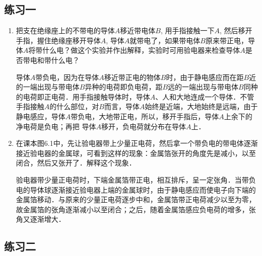 \subsection{练习一}
\begin{enumerate}
    \item 把支在绝缘座上的不带电的导体$A$移近带电体$B$, 用手指接触一下$A$, 然后移开手指，握住绝缘座移开导体$A$, 导体$A$就带电了，如果带电体$B$原来带正电，导体$A$将带什么电？做这个实验并作出解释，实验时可用验电器来检查导体$A$是否带电和带什么电？
    
    \begin{solution}
        导体$A$带负电，因为在导体$A$移近带正电的物体$B$时，由于静电感应而在距$B$近的一端出现与带电体$B$异种的电荷即负电荷，距$B$远的一端出现与带电体$B$同种的电荷即正电荷．用手指接触导体时，导体$A$、人和大地连成一个导体．不管手指接触$A$的什么部位，对$B$而言，导体$A$始终是近端，大地始终是远端，由于静电感应，导体$A$带负电，大地带正电，所以，移开手指后，导体$A$上余下的净电荷是负电；再把 导体$A$移开，负电荷就分布在导体$A$上．
    \end{solution}
   
    \item 在课本图6.1中，先让验电器带上少量正电荷，然后拿一个带负电的带电体逐渐接近验电器的金属球，可看到这样的现象：金属箔张开的角度先是减小，以至闭合，然后又张开了．解释这个现象．
    
\begin{solution}
  验电器带少量正电荷时，下端金属箔带正电，相互排斥，呈一定张角．当带负电的导体球逐渐接近验电器上端的金属球时，由于静电感应而使电子向下端的金属箔移动．与原来的少量正电荷逐步中和，金属箔带正电荷减少以至为零，故金属箔的张角逐渐减小以至闭合；之后，随着金属箔感应负电荷的增多，张角又逐渐增大．   
\end{solution}
\end{enumerate}



\subsection{练习二}

